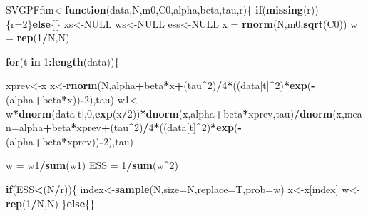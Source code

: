\documentclass[
]{book}
\newenvironment{Shaded}{\begin{snugshade}}{\end{snugshade}}
\newcommand{\ControlFlowTok}[1]{\textcolor[rgb]{0.13,0.29,0.53}{\textbf{#1}}}
\newcommand{\DataTypeTok}[1]{\textcolor[rgb]{0.13,0.29,0.53}{#1}}
\newcommand{\DecValTok}[1]{\textcolor[rgb]{0.00,0.00,0.81}{#1}}
\newcommand{\KeywordTok}[1]{\textcolor[rgb]{0.13,0.29,0.53}{\textbf{#1}}}
\newcommand{\NormalTok}[1]{#1}
\newcommand{\OperatorTok}[1]{\textcolor[rgb]{0.81,0.36,0.00}{\textbf{#1}}}
\newcommand{\OtherTok}[1]{\textcolor[rgb]{0.56,0.35,0.01}{#1}}
\newcommand{\StringTok}[1]{\textcolor[rgb]{0.31,0.60,0.02}{#1}}
\theoremstyle{break}
\theoremstyle{nonumberplain}
\begin{document}
\begin{Shaded}
\begin{Highlighting}[]
\NormalTok{SVGPFfun<-}\ControlFlowTok{function}\NormalTok{(data,N,m0,C0,alpha,beta,tau,r)\{}
  \ControlFlowTok{if}\NormalTok{(}\KeywordTok{missing}\NormalTok{(r))\{r=}\DecValTok{2}\NormalTok{\}}\ControlFlowTok{else}\NormalTok{\{\}}
\NormalTok{  xs<-}\OtherTok{NULL}
\NormalTok{  ws<-}\OtherTok{NULL}
\NormalTok{  ess<-}\OtherTok{NULL}
\NormalTok{  x  =}\StringTok{ }\KeywordTok{rnorm}\NormalTok{(N,m0,}\KeywordTok{sqrt}\NormalTok{(C0))}
\NormalTok{  w  =}\StringTok{ }\KeywordTok{rep}\NormalTok{(}\DecValTok{1}\OperatorTok{/}\NormalTok{N,N)}
  
  \ControlFlowTok{for}\NormalTok{(t }\ControlFlowTok{in} \DecValTok{1}\OperatorTok{:}\KeywordTok{length}\NormalTok{(data))\{}
    
\NormalTok{    xprev<-x}
\NormalTok{    x<-}\KeywordTok{rnorm}\NormalTok{(N,alpha}\OperatorTok{+}\NormalTok{beta}\OperatorTok{*}\NormalTok{x}\OperatorTok{+}\NormalTok{(tau}\OperatorTok{^}\DecValTok{2}\NormalTok{)}\OperatorTok{/}\DecValTok{4}\OperatorTok{*}\NormalTok{((data[t]}\OperatorTok{^}\DecValTok{2}\NormalTok{)}\OperatorTok{*}\KeywordTok{exp}\NormalTok{(}\OperatorTok{-}\NormalTok{(alpha}\OperatorTok{+}\NormalTok{beta}\OperatorTok{*}\NormalTok{x))}\OperatorTok{-}\DecValTok{2}\NormalTok{),tau)}
\NormalTok{    w1<-w}\OperatorTok{*}\KeywordTok{dnorm}\NormalTok{(data[t],}\DecValTok{0}\NormalTok{,}\KeywordTok{exp}\NormalTok{(x}\OperatorTok{/}\DecValTok{2}\NormalTok{))}\OperatorTok{*}\KeywordTok{dnorm}\NormalTok{(x,alpha}\OperatorTok{+}\NormalTok{beta}\OperatorTok{*}\NormalTok{xprev,tau)}\OperatorTok{/}\KeywordTok{dnorm}\NormalTok{(x,}\DataTypeTok{mean=}\NormalTok{alpha}\OperatorTok{+}\NormalTok{beta}\OperatorTok{*}\NormalTok{xprev}\OperatorTok{+}\NormalTok{(tau}\OperatorTok{^}\DecValTok{2}\NormalTok{)}\OperatorTok{/}\DecValTok{4}\OperatorTok{*}\NormalTok{((data[t]}\OperatorTok{^}\DecValTok{2}\NormalTok{)}\OperatorTok{*}\KeywordTok{exp}\NormalTok{(}\OperatorTok{-}\NormalTok{(alpha}\OperatorTok{+}\NormalTok{beta}\OperatorTok{*}\NormalTok{xprev))}\OperatorTok{-}\DecValTok{2}\NormalTok{),tau)}
    
\NormalTok{    w =}\StringTok{ }\NormalTok{w1}\OperatorTok{/}\KeywordTok{sum}\NormalTok{(w1)}
\NormalTok{    ESS  =}\StringTok{ }\DecValTok{1}\OperatorTok{/}\KeywordTok{sum}\NormalTok{(w}\OperatorTok{^}\DecValTok{2}\NormalTok{)}
    
    \ControlFlowTok{if}\NormalTok{(ESS}\OperatorTok{<}\NormalTok{(N}\OperatorTok{/}\NormalTok{r))\{}
\NormalTok{      index<-}\KeywordTok{sample}\NormalTok{(N,}\DataTypeTok{size=}\NormalTok{N,}\DataTypeTok{replace=}\NormalTok{T,}\DataTypeTok{prob=}\NormalTok{w)}
\NormalTok{      x<-x[index]}
\NormalTok{      w<-}\KeywordTok{rep}\NormalTok{(}\DecValTok{1}\OperatorTok{/}\NormalTok{N,N)}
\NormalTok{    \}}\ControlFlowTok{else}\NormalTok{\{\}}
    

\end{Highlighting}
\end{Shaded}
\end{document}
